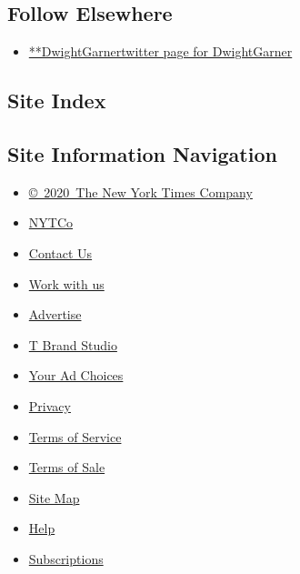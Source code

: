 \hypertarget{follow-elsewhere}{%
\subsection{Follow Elsewhere}\label{follow-elsewhere}}

\begin{itemize}
\tightlist
\item
  \href{https://twitter.com/DwightGarner}{**DwightGarnertwitter page for
  DwightGarner}
\end{itemize}

\hypertarget{site-index}{%
\subsection{Site Index}\label{site-index}}

\hypertarget{site-information-navigation}{%
\subsection{Site Information
Navigation}\label{site-information-navigation}}

\begin{itemize}
\tightlist
\item
  \href{https://help.nytimes3xbfgragh.onion/hc/en-us/articles/115014792127-Copyright-notice}{©~2020~The
  New York Times Company}
\end{itemize}

\begin{itemize}
\tightlist
\item
  \href{https://www.nytco.com/}{NYTCo}
\item
  \href{https://help.nytimes3xbfgragh.onion/hc/en-us/articles/115015385887-Contact-Us}{Contact
  Us}
\item
  \href{https://www.nytco.com/careers/}{Work with us}
\item
  \href{https://nytmediakit.com/}{Advertise}
\item
  \href{http://www.tbrandstudio.com/}{T Brand Studio}
\item
  \href{https://www.nytimes3xbfgragh.onion/privacy/cookie-policy\#how-do-i-manage-trackers}{Your
  Ad Choices}
\item
  \href{https://www.nytimes3xbfgragh.onion/privacy}{Privacy}
\item
  \href{https://help.nytimes3xbfgragh.onion/hc/en-us/articles/115014893428-Terms-of-service}{Terms
  of Service}
\item
  \href{https://help.nytimes3xbfgragh.onion/hc/en-us/articles/115014893968-Terms-of-sale}{Terms
  of Sale}
\item
  \href{https://spiderbites.nytimes3xbfgragh.onion}{Site Map}
\item
  \href{https://help.nytimes3xbfgragh.onion/hc/en-us}{Help}
\item
  \href{https://www.nytimes3xbfgragh.onion/subscription?campaignId=37WXW}{Subscriptions}
\end{itemize}
